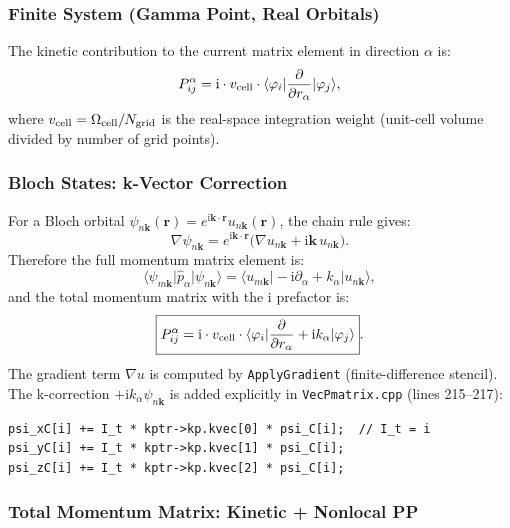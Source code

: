 \documentclass[12pt,letterpaper]{article}
\newcommand{\mel}[3]{\langle #1 \vert #2 \vert #3 \rangle}
\newcommand{\ii}{\mathrm{i}}
\begin{document}
\subsubsection{Finite System (Gamma Point, Real Orbitals)}

The kinetic contribution to the current matrix element in direction $\alpha$ is:
\begin{equation}
  P^\alpha_{ij} = \ii\cdot v_{\rm cell}\cdot\mel{\varphi_i}{\frac{\partial}{\partial r_\alpha}}{\varphi_j},
  \label{eq:Palpha_gamma}
\end{equation}
where $v_{\rm cell} = \Omega_{\rm cell}/N_{\rm grid}$ is the real-space integration
weight (unit-cell volume divided by number of grid points).

\subsubsection{Bloch States: k-Vector Correction}

For a Bloch orbital $\psi_{n\bm{k}}(\bm{r}) = e^{\ii\bm{k}\cdot\bm{r}}u_{n\bm{k}}(\bm{r})$,
the chain rule gives:
\begin{equation}
  \nabla\psi_{n\bm{k}} = e^{\ii\bm{k}\cdot\bm{r}}\bigl(\nabla u_{n\bm{k}} + \ii\bm{k}\,u_{n\bm{k}}\bigr).
\end{equation}
Therefore the full momentum matrix element is:
\begin{equation}
  \mel{\psi_{m\bm{k}}}{\hat{p}_\alpha}{\psi_{n\bm{k}}}
  = \mel{u_{m\bm{k}}}{-\ii\partial_\alpha + k_\alpha}{u_{n\bm{k}}},
\end{equation}
and the total momentum matrix with the $\ii$ prefactor is:
\begin{equation}
  \boxed{P^\alpha_{ij} = \ii\cdot v_{\rm cell}
    \cdot\mel{\varphi_i}{\frac{\partial}{\partial r_\alpha} + \ii k_\alpha}{\varphi_j}}.
  \label{eq:Palpha_bloch}
\end{equation}
The gradient term $\nabla u$ is computed by \texttt{ApplyGradient} (finite-difference
stencil).  The k-correction $+\ii k_\alpha \psi_{n\bm{k}}$ is added explicitly in
\texttt{VecPmatrix.cpp} (lines 215--217):
\begin{lstlisting}[style=cppstyle, caption={k-correction in VecPmatrix.cpp}]
psi_xC[i] += I_t * kptr->kp.kvec[0] * psi_C[i];  // I_t = i
psi_yC[i] += I_t * kptr->kp.kvec[1] * psi_C[i];
psi_zC[i] += I_t * kptr->kp.kvec[2] * psi_C[i];
\end{lstlisting}

\subsubsection{Total Momentum Matrix: Kinetic + Nonlocal PP}
\label{sec:Ptotal}
\end{document}
